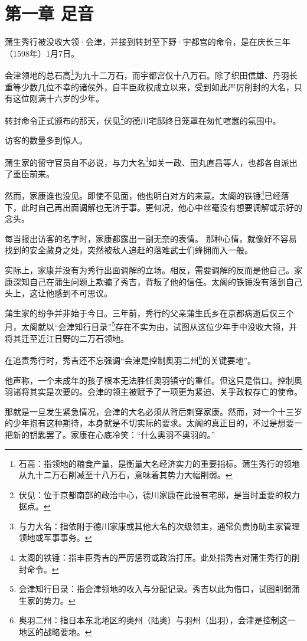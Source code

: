 \documentclass[
]{book}
\begin{document}
\chapter*{第一章 足音}\label{ux7b2cux4e00ux7ae0-ux8db3ux97f3}

蒲生秀行被没收大领·会津，并接到转封至下野·宇都宫的命令，是在庆长三年（1598年）1月7日。

会津领地的总石高\footnote{石高：指领地的粮食产量，是衡量大名经济实力的重要指标。蒲生秀行的领地从九十二万石削减至十八万石，意味着其势力大幅削弱。}为九十二万石，而宇都宫仅十八万石。除了织田信雄、丹羽长重等少数几位不幸的诸侯外，自丰臣政权成立以来，受到如此严厉削封的大名，只有这位刚满十六岁的少年。

转封命令正式颁布的那天，伏见\footnote{伏见：位于京都南部的政治中心，德川家康在此设有宅邸，是当时重要的权力据点。}的德川宅邸终日笼罩在匆忙喧嚣的氛围中。

访客的数量多到惊人。

蒲生家的留守官员自不必说，与力大名\footnote{与力大名：指依附于德川家康或其他大名的次级领主，通常负责协助主家管理领地或军事事务。}如关一政、田丸直昌等人，也都各自派出了重臣前来。

然而，家康谁也没见。即使不见面，他也明白对方的来意。太阁的铁锤\footnote{太阁的铁锤：指丰臣秀吉的严厉惩罚或政治打压。此处指秀吉对蒲生秀行的削封命令。}已经落下，此时自己再出面调解也无济于事。更何况，他心中丝毫没有想要调解或示好的念头。

每当报出访客的名字时，家康都露出一副无奈的表情。
那种心情，就像好不容易找到的安全藏身之处，突然被敌人追赶的落难武士们蜂拥而入一般。

实际上，家康并没有为秀行出面调解的立场。相反，需要调解的反而是他自己。家康深知自己在蒲生问题上欺骗了秀吉，背叛了他的信任。太阁的铁锤没有落到自己头上，这让他感到不可思议。

蒲生家的纷争并非始于今日。三年前，秀行的父亲蒲生氏乡在京都病逝后仅三个月，太阁就以``会津知行目录''\footnote{会津知行目录：指会津领地的收入与分配记录。秀吉以此为借口，试图削弱蒲生家的势力。}存在不实为由，试图从这位少年手中没收大领，并将其迁至近江日野的二万石领地。

在追责秀行时，秀吉还不忘强调``会津是控制奥羽二州\footnote{奥羽二州：指日本东北地区的奥州（陆奥）与羽州（出羽），会津是控制这一地区的战略要地。}的关键要地''。

他声称，一个未成年的孩子根本无法胜任奥羽镇守的重任。但这只是借口。控制奥羽诸将其实是次要的。会津的领主被赋予了一项更为紧迫、关乎政权存亡的使命。

那就是一旦发生紧急情况，会津的大名必须从背后刺穿家康。然而，对一个十三岁的少年抱有这种期待，本身就是不切实际的要求。太阁的真正目的，不过是想要一把新的钥匙罢了。家康在心底冷笑：``什么奥羽不奥羽的。''
\end{document}
